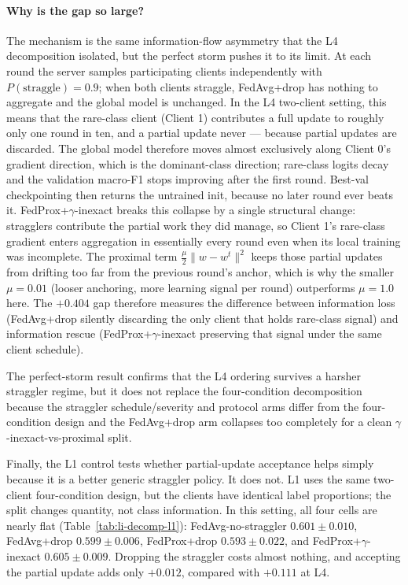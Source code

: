 \documentclass[11pt,a4paper]{report}
\begin{document}
\paragraph{Why is the gap so large?}
The mechanism is the same information-flow asymmetry that the L4
decomposition isolated, but the perfect storm pushes it to its limit. At
each round the server samples participating clients independently with
$P(\text{straggle}) = 0.9$; when both clients straggle, FedAvg+drop has
nothing to aggregate and the global model is unchanged. In the L4
two-client setting, this means that the rare-class client (Client 1)
contributes a full update to roughly only one round in ten, and a partial
update never --- because partial updates are discarded. The global model
therefore moves almost exclusively along Client 0's gradient direction,
which is the dominant-class direction; rare-class logits decay and the
validation macro-F1 stops improving after the first round. Best-val
checkpointing then returns the untrained init, because no later round ever
beats it. FedProx+$\gamma$-inexact breaks this collapse by a single
structural change: stragglers contribute the partial work they did manage,
so Client 1's rare-class gradient enters aggregation in essentially every
round even when its local training was incomplete. The proximal term
$\tfrac{\mu}{2}\lVert w - w^t \rVert^2$ keeps those partial updates from
drifting too far from the previous round's anchor, which is why the smaller
$\mu = 0.01$ (looser anchoring, more learning signal per round) outperforms
$\mu = 1.0$ here. The $+0.404$ gap therefore measures the difference
between information loss (FedAvg+drop silently discarding the only client
that holds rare-class signal) and information rescue (FedProx+$\gamma$-inexact
preserving that signal under the same client schedule).

The perfect-storm result confirms that the L4 ordering survives a harsher
straggler regime, but it does not replace the four-condition decomposition
because the straggler schedule/severity and protocol arms differ from
the four-condition design and the FedAvg+drop arm collapses too
completely for a clean $\gamma$-inexact-vs-proximal split.

Finally, the L1 control tests whether partial-update acceptance helps simply
because it is a better generic straggler policy. It does not. L1 uses the
same two-client four-condition design, but the clients have identical label
proportions; the split changes quantity, not class information. In this
setting, all four cells are nearly flat (Table~\ref{tab:li-decomp-l1}):
FedAvg-no-straggler $0.601 \pm 0.010$, FedAvg+drop $0.599 \pm 0.006$,
FedProx+drop $0.593 \pm 0.022$, and FedProx+$\gamma$-inexact
$0.605 \pm 0.009$. Dropping the straggler costs almost nothing, and accepting
the partial update adds only $+0.012$, compared with $+0.111$ at L4.
\end{document}
